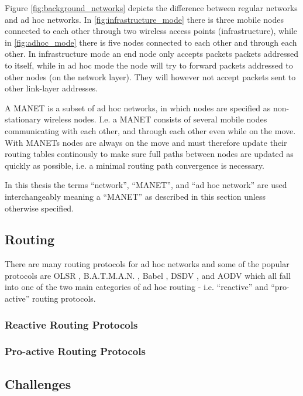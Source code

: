 Figure \ref{fig:background_networks} depicts the difference between regular
networks and ad hoc networks. In \ref{fig:infrastructure_mode} there is three
mobile nodes connected to each other through two wireless access points
(infrastructure), while in \ref{fig:adhoc_mode} there is five nodes connected to
each other and through each other. In infrastructure mode an end node only
accepts packets packets addressed to itself, while in ad hoc mode the node will
try to forward packets addressed to other nodes (on the network layer). They
will however not accept packets sent to other link-layer addresses.

A \ac{MANET} is a subset of ad hoc networks, in which nodes are specified as
non-stationary wireless nodes. I.e. a \ac{MANET} consists of several mobile
nodes communicating with each other, and through each other even while on the
move. With \acp{MANET} nodes are always on the move and must therefore update
their routing tables continously to make sure full paths between nodes are
updated as quickly as possible, i.e. a minimal routing path convergence is
necessary.

In this thesis the terms ``network'', ``\ac{MANET}'', and ``ad hoc network''
are used interchangeably meaning a ``\ac{MANET}'' as described in this section
unless otherwise specified.

\subsection{Routing}
There are many routing protocols for ad hoc networks and some of the popular
protocols are OLSR \cite{olsr_paper}, B.A.T.M.A.N. \cite{batman_rfc}, Babel
\cite{rfc6126}, DSDV \cite{he2002destination}, and AODV
\cite{Perkins:2003:AHO:RFC3561} which all fall into one of the two main
categories of ad hoc routing - i.e. ``reactive'' and ``pro-active'' routing
protocols.

\subsubsection*{Reactive Routing Protocols}


\subsubsection*{Pro-active Routing Protocols}


\subsection{Challenges}

